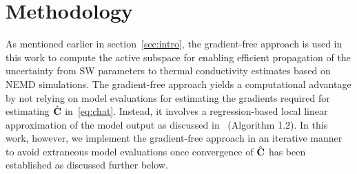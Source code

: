 \section{Methodology}
\label{sec:method}

As mentioned earlier in section~\ref{sec:intro}, the gradient-free approach is used in this work
to compute the active subspace for enabling efficient propagation of the uncertainty from SW
parameters to thermal conductivity estimates based on NEMD simulations. The gradient-free
approach yields a computational advantage by not relying on model evaluations for estimating
the gradients required for estimating $\hat{\mathbf{{C}}}$ in~\eqref{eq:chat}. 
Instead, it involves a regression-based local linear approximation of the model output as
discussed in~\cite{Constantine:2015} (Algorithm 1.2). In this work, however, we implement the
gradient-free approach in an iterative manner to avoid extraneous model evaluations once
convergence of $\hat{\mathbf{{C}}}$ has been established as discussed further below. 

